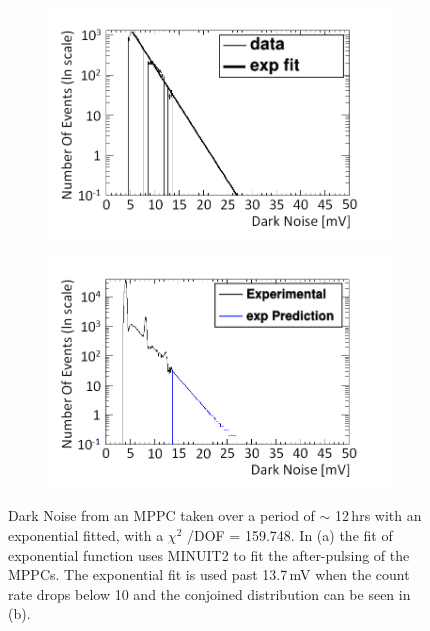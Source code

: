\begin{figure}[!h]
\centering
\begin{subfigure}{.5\textwidth}
  \centering
  \includegraphics[width=\linewidth]{Chapter4/Figs/Raster/fit_of_dark_noiseMedText.png}
  \captionsetup{width=.9\linewidth}
  \caption{}
  \label{subFig:expFitOfDark}
\end{subfigure}%
\begin{subfigure}{.5\textwidth}
  \centering
  \includegraphics[width=\linewidth]{Chapter4/Figs/Raster/fittedDarkNoise_outputMedText.png}
  \captionsetup{width=.9\linewidth}
  \caption{}
  \label{subFig:fittedDarkNoise}
\end{subfigure}
\caption{Dark Noise from an MPPC taken over a period of $\sim$ 12\,hrs with an exponential fitted, with a $\chi ^2$ /DOF = 159.748. In (a) the fit of exponential function uses MINUIT2 to fit the after-pulsing of the MPPCs. The exponential fit is used past 13.7\,mV when the count rate drops below 10 and the conjoined distribution can be seen in (b).}
\label{fig:fitting_of_non_peak_dark_noise}
\end{figure}

